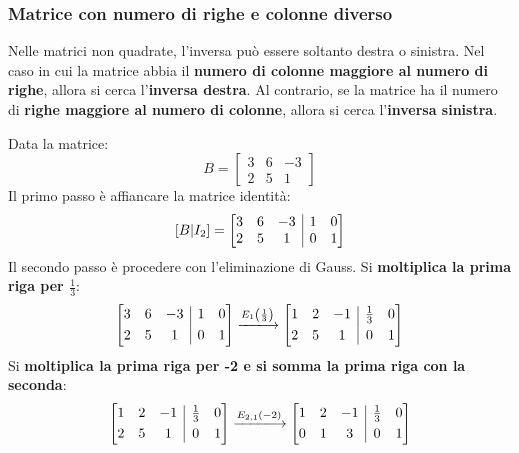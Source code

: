 \documentclass[a4paper]{article}
\makeatletter
\newenvironment{rowequmatbra}[1]{\left[\array{@{}#1@{}}}{\endarray\right]}
\makeatother
\begin{document}
	\subsubsection{Matrice con numero di righe e colonne diverso}
	
	Nelle matrici non quadrate, l'inversa può essere soltanto destra o sinistra. Nel caso in cui la matrice abbia il \textbf{numero di colonne maggiore al numero di righe}, allora si cerca l'\textbf{inversa destra}. Al contrario, se la matrice ha il numero di \textbf{righe maggiore al numero di colonne}, allora si cerca l'\textbf{inversa sinistra}.\newline
	
	\noindent
	Data la matrice:
	\begin{equation*}
		B = \begin{bmatrix}
			3 & 6 & -3 \\
			2 & 5 &  1
		\end{bmatrix}
	\end{equation*}
	Il \textcolor{Red3}{primo passo} è affiancare la matrice identità:
	\begin{equation*}
		\left[B | I_{2}\right] = \begin{rowequmatbra}{ccc|cc}
			3 & 6 & -3 & 1 & 0 \\
			2 & 5 &  1 & 0 & 1 
		\end{rowequmatbra}
	\end{equation*}
	Il \textcolor{Red3}{secondo passo} è procedere con l'eliminazione di Gauss. Si \textbf{moltiplica la prima riga per $\frac{1}{3}$}:
	\begin{equation*}
		\begin{rowequmatbra}{ccc|cc}
			3 & 6 & -3 & 1 & 0 \\ [0.3em]
			2 & 5 &  1 & 0 & 1
		\end{rowequmatbra} \xlongrightarrow{E_{1}\left(\frac{1}{3}\right)}
		\begin{rowequmatbra}{ccc|cc}
			1 & 2 & -1 & \frac{1}{3} & 0 \\ [0.3em]
			2 & 5 &  1 &           0 & 1
		\end{rowequmatbra}
	\end{equation*}
	Si \textbf{moltiplica la prima riga per -2 e si somma la prima riga con la seconda}:
	\begin{equation*}
		\begin{rowequmatbra}{ccc|cc}
			1 & 2 & -1 & \frac{1}{3} & 0 \\ [0.3em]
			2 & 5 &  1 &           0 & 1
		\end{rowequmatbra} \xlongrightarrow{E_{2,1}\left(-2\right)}
		\begin{rowequmatbra}{ccc|cc}
			1 & 2 & -1 & \frac{1}{3} & 0 \\ [0.3em]
			0 & 1 &  3 &           0 & 1
		\end{rowequmatbra}
	\end{equation*}
\end{document}
